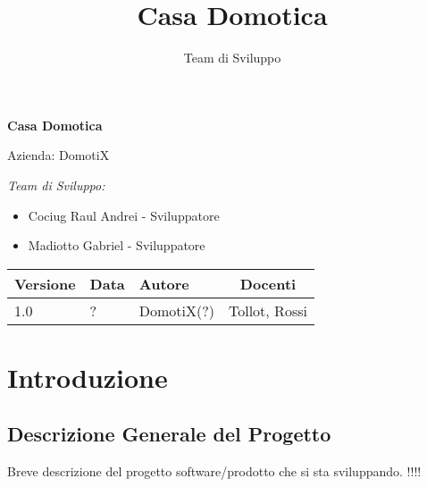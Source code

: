\documentclass[a4paper,12pt]{article}
\title{Casa Domotica}
\author{Team di Sviluppo}
\date{}
\begin{document}
\begin{titlepage}
    \centering
    \vspace*{2cm}
    
    {\huge\bfseries Casa Domotica\par}
    \vspace{1.5cm}
    
    {\Large Azienda: DomotiX\par}
    \vspace{2cm}
    
    {\large\itshape Team di Sviluppo:\par}
    \vspace{0.5cm}
    
    \begin{itemize}
        \item Cociug Raul Andrei - Sviluppatore
        \item Madiotto Gabriel - Sviluppatore
    \end{itemize}
    
    \vfill
    
    \begin{table}[h]
    \centering
    \begin{tabular}{@{}lllc@{}}
    \toprule
    Versione & Data & Autore & Docenti \\
    \midrule
    1.0 & ? & DomotiX(?) & Tollot, Rossi \\
    \bottomrule
    \end{tabular}
    \end{table}
    
    \thispagestyle{empty}
\end{titlepage}

\tableofcontents
\newpage

\fancyfoot[C]{\thepage}

\section{Introduzione}
\subsection{Descrizione Generale del Progetto}
Breve descrizione del progetto software/prodotto che si sta sviluppando. !!!!
\end{document}
